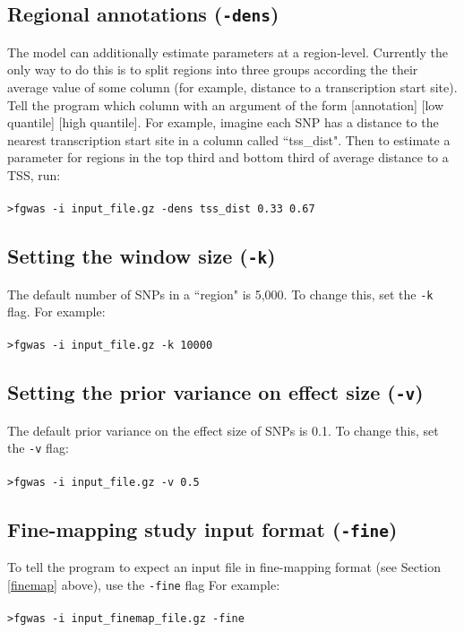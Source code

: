 \documentclass[11pt,titlepage]{article}
\begin{document}
\subsection{Regional annotations (\texttt{-dens})}
The model can additionally estimate parameters at a region-level. Currently the only way to do this is to split regions into three groups according the their average value of some column (for example, distance to a transcription start site). Tell the program which column with an argument of the form [annotation] [low quantile] [high quantile]. For example, imagine each SNP has a distance to the nearest transcription start site in a column called ``tss\_dist". Then to estimate a parameter for regions in the top third and bottom third of average distance to a TSS, run:
\\
\\
\noindent \texttt{>fgwas -i input\_file.gz -dens tss\_dist 0.33 0.67}

\subsection{Setting the window size (\texttt{-k})}
The default number of SNPs in a ``region" is 5,000. To change this, set the \texttt{-k} flag. For example:
\\
\\
\noindent \texttt{>fgwas -i input\_file.gz -k 10000}\\

\subsection{Setting the prior variance on effect size (\texttt{-v})}
The default prior variance on the effect size of SNPs is 0.1. To change this, set the \texttt{-v} flag:
\\
\\
\noindent \texttt{>fgwas -i input\_file.gz -v 0.5}\\

\subsection{Fine-mapping study input format (\texttt{-fine})}
To tell the program to expect an input file in fine-mapping format (see Section \ref{finemap} above), use the \texttt{-fine} flag For example:
\\
\\
\texttt{>fgwas -i input\_finemap\_file.gz -fine}
\end{document}
